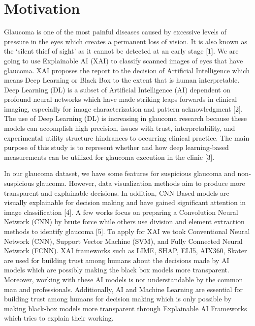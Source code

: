 \section{Motivation} 
Glaucoma is one of the most painful diseases caused by excessive levels of pressure in the eyes which creates a permanent loss of vision. It is also known as the ‘silent thief of sight’ as it cannot be detected at an early stage [1]. We are going to use Explainable AI (XAI) to classify scanned images of eyes that have glaucoma. XAI proposes the report to the decision of Artificial Intelligence which means Deep Learning or Black Box to the extent that is human interpretable. Deep Learning (DL) is a subset of Artificial Intelligence (AI) dependent on profound neural networks which have made striking leaps forwards in clinical imaging, especially for image characterization and pattern acknowledgment [2]. The use of Deep Learning (DL) is increasing in glaucoma research because these models can accomplish high precision, issues with trust, interpretability, and experimental utility structure hindrances to occurring clinical practice. The main purpose of this study is to represent whether and how deep learning-based measurements can be utilized for glaucoma execution in the clinic [3].

\vspace{5mm}
In our glaucoma dataset, we have some features for suspicious glaucoma and non-suspicious glaucoma. However, data visualization methods aim to produce more transparent and explainable decisions. In addition, CNN Based models are visually explainable for decision making and have gained significant attention in image classification [4]. A few works focus on preparing a Convolution Neural Network (CNN) by brute force while others use division and element extraction methods to identify glaucoma [5]. To apply for XAI we took Conventional Neural Network (CNN), Support Vector Machine (SVM), and Fully Connected Neural Network (FCNN). XAI frameworks such as LIME, SHAP, ELI5, AIX360, Skater are used for building trust among humans about the decisions made by AI models which are possibly making the black box models more transparent. Moreover, working with these AI models is not understandable by the common man and professionals. Additionally, AI and Machine Learning are essential for building trust among humans for decision making which is only possible by making black-box models more transparent through Explainable AI Frameworks which tries to explain their working.

